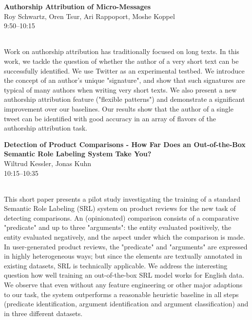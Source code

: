 \documentclass[twoside,makeidx]{book}
\begin{document}
\par\vspace{2em}\noindent%
\begin{minipage}{\linewidth}%
\begin{center}
\textbf{\normalsize Authorship Attribution of Micro-Messages}\\
\normalsize  Roy Schwartz,  Oren Tsur,  Ari Rappoport,  Moshe Koppel\\
{\small 9:50--10:15}\\
\end{center}
\end{minipage}\\[0.5em]
\nopagebreak%
\noindent%
{\small Work on authorship attribution has traditionally focused on long texts. In this work, we tackle the question of whether the author of a very short text can be successfully identified. We use Twitter as an experimental testbed. We introduce the concept of an author's unique "signature", and show that such signatures are typical of many authors when writing very short texts. We also present a new authorship attribution feature ("flexible patterns") and demonstrate a significant improvement over our baselines. Our results show that the author of a single tweet can be identified with good accuracy in an array of flavors of the authorship attribution task.}
\par\vspace{2em}\noindent%
\begin{minipage}{\linewidth}%
\begin{center}
\textbf{\normalsize Detection of Product Comparisons - How Far Does an Out-of-the-Box Semantic Role Labeling System Take You?}\\
\normalsize  Wiltrud Kessler,  Jonas Kuhn\\
{\small 10:15--10:35}\\
\end{center}
\end{minipage}\\[0.5em]
\nopagebreak%
\noindent%
{\small This short paper presents a pilot study investigating the training of a standard Semantic Role Labeling (SRL) system on product reviews for the new task of detecting comparisons. An (opinionated) comparison consists of a comparative "predicate" and up to three "arguments": the entity evaluated positively, the entity evaluated negatively, and the aspect under which the comparison is made. In user-generated product reviews, the "predicate" and "arguments" are expressed in highly heterogeneous ways; but since the elements are textually annotated in existing datasets, SRL is technically applicable. We address the interesting question how well training an out-of-the-box SRL model works for English data. We observe that even without any feature engineering or other major adaptions to our task, the system outperforms a reasonable heuristic baseline in all steps (predicate identification, argument identification and argument classification) and in three different datasets.}
\clearpage
\end{document}
